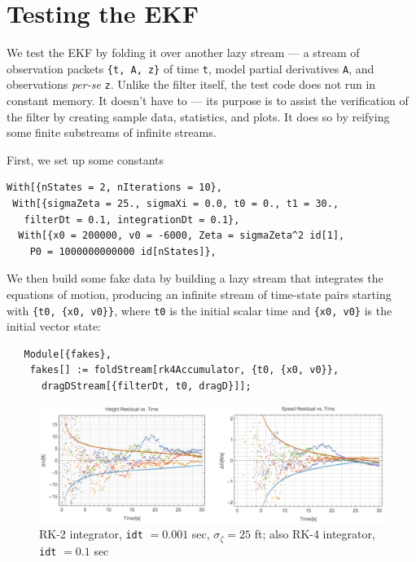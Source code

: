 \documentclass[10pt,oneside,x11names]{article}
\begin{document}
\section{Testing the EKF}
\label{sec:orgheadline14}

We test the EKF by folding it over another lazy stream --- a stream of
observation packets \texttt{\{t, A, z\}} of time \texttt{t}, model partial derivatives \texttt{A}, and
observations \emph{per-se} \texttt{z}. Unlike the filter itself, the test code does not run
in constant memory. It doesn't have to --- its purpose is to assist the
verification of the filter by creating sample data, statistics, and plots. It
does so by reifying some finite substreams of infinite streams.

First, we set up some constants

\begin{verbatim}
With[{nStates = 2, nIterations = 10},
 With[{sigmaZeta = 25., sigmaXi = 0.0, t0 = 0., t1 = 30., 
   filterDt = 0.1, integrationDt = 0.1},
  With[{x0 = 200000, v0 = -6000, Zeta = sigmaZeta^2 id[1], 
    P0 = 1000000000000 id[nStates]},
\end{verbatim}

\noindent We then build some fake data by building a lazy stream that integrates
the equations of motion, producing an infinite stream of time-state pairs
starting with \texttt{\{t0, \{x0, v0\}\}}, where \texttt{t0} is the initial scalar time and \texttt{\{x0,
v0\}} is the initial vector state:

\begin{verbatim}
   Module[{fakes},
    fakes[] := foldStream[rk4Accumulator, {t0, {x0, v0}},
      dragDStream[{filterDt, t0, dragD}]];
\end{verbatim}

\begin{figure}[htb]
\centering
\includegraphics[width=.9\linewidth]{rk2-idt-point-001-zeta-25.png}
\caption{\label{fig:orgparagraph1}
RK-2 integrator, \texttt{idt} \(= 0.001\) sec, \(\sigma_\zeta = 25\) ft; also RK-4 integrator, \texttt{idt} \(= 0.1\) sec}
\end{figure}
\end{document}
